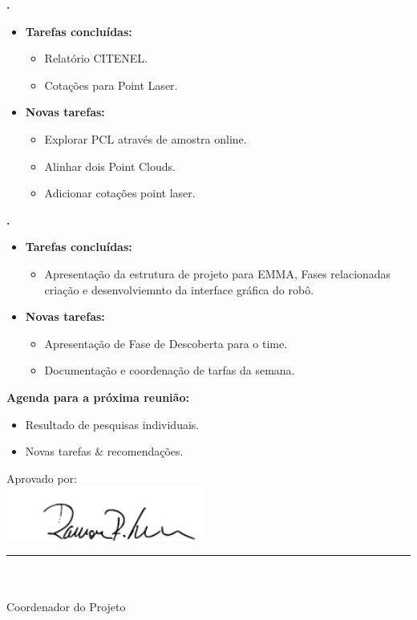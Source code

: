 	
	  \textbf{\elael.} 
	\begin{itemize}
		\item \textbf{Tarefas concluídas:}
			\begin{itemize}    
				\item Relatório CITENEL.
				\item Cotações para Point Laser. 
			\end{itemize}
		
		\item \textbf{Novas tarefas:}
			\begin{itemize} 
			    \item Explorar PCL através de amostra online.
			    \item Alinhar dois Point Clouds.
			    \item Adicionar cotações point laser.
			\end{itemize}
	\end{itemize}			
			
			
   \textbf{\julia.} 
	\begin{itemize}
		\item \textbf{Tarefas concluídas:}
			\begin{itemize}    
				\item Apresentação da estrutura de projeto para EMMA, Fases relacionadas
				criação e desenvolviemnto da interface gráfica do robô.
			\end{itemize}
		
		\item \textbf{Novas tarefas:}
			\begin{itemize} 
			    \item Apresentação de Fase de Descoberta para o time.
			    \item Documentação e coordenação de tarfas da semana.
			\end{itemize}
	\end{itemize}		



\textbf{Agenda para a próxima reunião:}
  \begin{itemize}
    \item Resultado de pesquisas individuais.
    \item Novas tarefas \& recomendações.
  \end{itemize}


\vspace{5mm}%
\parbox[t]{70mm}{
  Aprovado por: \\[5mm]
  \centering
  \includegraphics[width=65mm]{figs/logo/assinatura-ramon.png} \\[-4mm]
  \rule[2mm]{70mm}{0.1mm} \\
  \ramon \\[1mm]
  Coordenador do Projeto \\
}

\fim